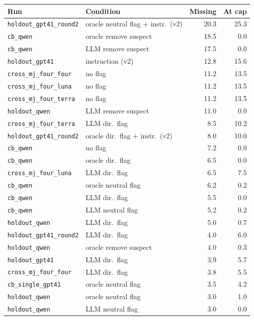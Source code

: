 \begin{table}[t]
\centering\scriptsize
\setlength{\tabcolsep}{3pt}
\begin{tabular}{@{}llrr@{}}
\toprule
Run & Condition & Missing & At cap \\
\midrule
\texttt{holdout\_gpt41\_round2} & oracle neutral flag + instr.\ (v2) & 20.3 & 25.3 \\
\texttt{cb\_qwen} & oracle remove suspect & 18.5 & 0.0 \\
\texttt{cb\_qwen} & LLM remove suspect & 17.5 & 0.0 \\
\texttt{holdout\_gpt41} & instruction (v2) & 12.8 & 15.6 \\
\texttt{cross\_mj\_four\_four} & no flag & 11.2 & 13.5 \\
\texttt{cross\_mj\_four\_luna} & no flag & 11.2 & 13.5 \\
\texttt{cross\_mj\_four\_terra} & no flag & 11.2 & 13.5 \\
\texttt{holdout\_qwen} & LLM remove suspect & 11.0 & 0.0 \\
\texttt{cross\_mj\_four\_terra} & LLM dir.\ flag & 8.5 & 10.2 \\
\texttt{holdout\_gpt41\_round2} & oracle dir.\ flag + instr.\ (v2) & 8.0 & 10.0 \\
\texttt{cb\_qwen} & no flag & 7.2 & 0.0 \\
\texttt{cb\_qwen} & oracle dir.\ flag & 6.5 & 0.0 \\
\texttt{cross\_mj\_four\_luna} & LLM dir.\ flag & 6.5 & 7.5 \\
\texttt{cb\_qwen} & oracle neutral flag & 6.2 & 0.2 \\
\texttt{cb\_qwen} & LLM dir.\ flag & 5.5 & 0.0 \\
\texttt{cb\_qwen} & LLM neutral flag & 5.2 & 0.2 \\
\texttt{holdout\_qwen} & LLM dir.\ flag & 5.0 & 0.7 \\
\texttt{holdout\_gpt41\_round2} & LLM dir.\ flag & 4.0 & 6.0 \\
\texttt{holdout\_qwen} & oracle remove suspect & 4.0 & 0.3 \\
\texttt{holdout\_gpt41} & LLM dir.\ flag & 3.9 & 5.7 \\
\texttt{cross\_mj\_four\_four} & LLM dir.\ flag & 3.8 & 5.5 \\
\texttt{cb\_single\_gpt41} & oracle neutral flag & 3.5 & 4.2 \\
\texttt{holdout\_qwen} & oracle neutral flag & 3.0 & 1.0 \\
\texttt{holdout\_qwen} & LLM neutral flag & 3.0 & 0.0 \\

\end{tabular}
\end{table}

